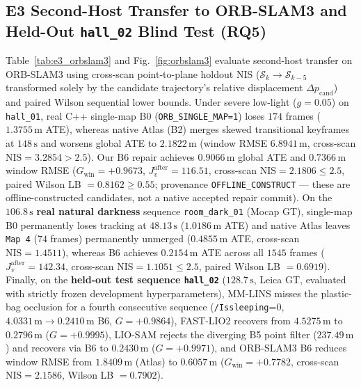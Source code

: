 \documentclass[journal]{IEEEtran}
\begin{document}
\subsection{E3 Second-Host Transfer to ORB-SLAM3 and Held-Out \texorpdfstring{\texttt{hall\_02}}{hall\_02} Blind Test (RQ5)}
Table~\ref{tab:e3_orbslam3} and Fig.~\ref{fig:orbslam3} evaluate second-host transfer on ORB-SLAM3 \cite{campos2021orbslam3} using cross-scan point-to-plane holdout NIS ($\mathcal{S}_k \to \mathcal{S}_{k-5}$ transformed solely by the candidate trajectory's relative displacement $\Delta p_{\mathrm{cand}}$) and paired Wilson sequential lower bounds. Under severe low-light ($g=0.05$) on \texttt{hall\_01}, real C++ single-map B0 (\texttt{ORB\_SINGLE\_MAP=1}) loses $174$ frames ($1.3755\,\mathrm{m}$ ATE), whereas native Atlas (B2) merges skewed transitional keyframes at $148\,\mathrm{s}$ and worsens global ATE to $2.1822\,\mathrm{m}$ (window RMSE $6.8941\,\mathrm{m}$, cross-scan $\mathrm{NIS}=3.2854 > 2.5$). Our B6 repair achieves $0.9066\,\mathrm{m}$ global ATE and $0.7366\,\mathrm{m}$ window RMSE ($G_{\mathrm{win}}=+0.9673$, $J_v^{\mathrm{after}}=116.51$, cross-scan $\mathrm{NIS}=2.1806\le 2.5$, paired Wilson LB $=0.8162\ge 0.55$; provenance \texttt{OFFLINE\_CONSTRUCT} --- these are offline-constructed candidates, not a native accepted repair commit). On the $106.8\,\mathrm{s}$ \textbf{real natural darkness} sequence \texttt{room\_dark\_01} (Mocap GT), single-map B0 permanently loses tracking at $48.13\,\mathrm{s}$ ($1.0186\,\mathrm{m}$ ATE) and native Atlas leaves \texttt{Map~4} ($74$ frames) permanently unmerged ($0.4855\,\mathrm{m}$ ATE, cross-scan $\mathrm{NIS}=1.4511$), whereas B6 achieves $0.2154\,\mathrm{m}$ ATE across all $1545$ frames ($J_v^{\mathrm{after}}=142.34$, cross-scan $\mathrm{NIS}=1.1051\le 2.5$, paired Wilson LB $=0.6919$). Finally, on the \textbf{held-out test sequence \texttt{hall\_02}} ($128.7\,\mathrm{s}$, Leica GT, evaluated with strictly frozen development hyperparameters), MM-LINS misses the plastic-bag occlusion for a fourth consecutive sequence (\texttt{/Issleeping}=0, $4.0331\,\mathrm{m}\to 0.2410\,\mathrm{m}$ B6, $G=+0.9864$), FAST-LIO2 recovers from $4.5275\,\mathrm{m}$ to $\mathbf{0.2796\,\mathrm{m}}$ ($G=+0.9995$), LIO-SAM rejects the diverging B5 point filter ($237.49\,\mathrm{m}$) and recovers via B6 to $\mathbf{0.2430\,\mathrm{m}}$ ($G=+0.9971$), and ORB-SLAM3 B6 reduces window RMSE from $1.8409\,\mathrm{m}$ (Atlas) to $\mathbf{0.6057\,\mathrm{m}}$ ($G_{\mathrm{win}}=+0.7782$, cross-scan $\mathrm{NIS}=2.1586$, Wilson LB $=0.7902$).
\end{document}
